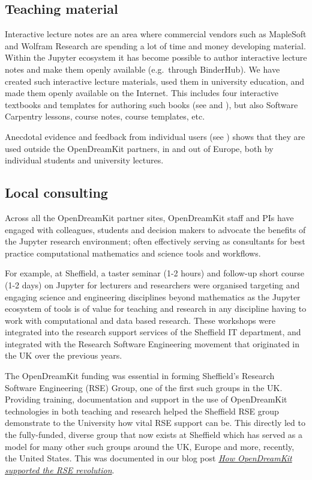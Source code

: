 \documentclass{deliverablereport}
\begin{document}
\subsection{Teaching material}

Interactive lecture notes are an area where commercial vendors such as
MapleSoft and Wolfram Research are spending a lot of time and money
developing material. Within the Jupyter ecosystem it has become possible
to author interactive lecture notes and make them openly available
(e.g.~through BinderHub). We have created such interactive lecture
materials, used them in university education, and made them openly
available on the Internet. This includes four interactive textbooks and
templates for authoring such books (see
 and ),
but also Software Carpentry lessons, course notes, course templates,
etc.

Anecdotal evidence and feedback from individual users (see ) shows
that they are used outside the OpenDreamKit partners, in and out of
Europe, both by individual students and university lectures.

\subsection{Local consulting}

Across all the OpenDreamKit partner sites, OpenDreamKit staff and PIs
have engaged with colleagues, students and decision makers to advocate
the benefits of the Jupyter research environment; often effectively
serving as consultants for best practice computational mathematics and
science tools and workflows.

For example,
at Sheffield, a taster seminar (1-2 hours) and follow-up short course (1-2
days) on Jupyter for lecturers and researchers were organised targeting
and engaging science and engineering disciplines beyond mathematics as
the Jupyter ecosystem of tools is of value for teaching and research in
any discipline having to work with computational and data based
research. These workshops were integrated into the research support
services of the Sheffield IT department, and integrated with the
Research Software Engineering movement that originated in the UK over
the previous years.

The OpenDreamKit funding was essential in forming Sheffield's Research
Software Engineering (RSE) Group, one of the first such groups in the
UK. Providing training, documentation and support in the use of
OpenDreamKit technologies in both teaching and research helped the
Sheffield RSE group demonstrate to the University how vital RSE support
can be. This directly led to the fully-funded, diverse group that now
exists at Sheffield which has served as a model for many other such
groups around the UK, Europe and more, recently, the United States.
This was documented in our blog post
\href{https://opendreamkit.org/2018/10/29/ODK-RSE/}{\emph{How
OpenDreamKit supported the RSE revolution}}.
\end{document}
